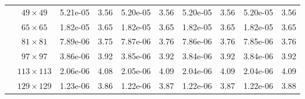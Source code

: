 \begin{table}[H]
{\begin{tabular*}{\textwidth}{@{\extracolsep\fill}c|c|cc|cc|cc|cc@{}}
                    & $49\times 49$ & 5.21e-05 & 3.56 & 5.20e-05 & 3.56 & 5.20e-05 & 3.56 & 5.20e-05 & 3.56 \\
                    & $65\times 65$ & 1.82e-05 & 3.65 & 1.82e-05 & 3.65 & 1.82e-05 & 3.65 & 1.82e-05 & 3.65 \\
                    & $81\times 81$ & 7.89e-06 & 3.75 & 7.87e-06 & 3.76 & 7.86e-06 & 3.76 & 7.85e-06 & 3.76 \\
                    & $97\times 97$ & 3.86e-06 & 3.92 & 3.85e-06 & 3.92 & 3.84e-06 & 3.92 & 3.84e-06 & 3.92 \\
                    & $113\times 113$ & 2.06e-06 & 4.08 & 2.05e-06 & 4.09 & 2.04e-06 & 4.09 & 2.04e-06 & 4.09 \\
                    & $129\times 129$ & 1.23e-06 & 3.86 & 1.22e-06 & 3.87 & 1.22e-06 & 3.87 & 1.22e-06 & 3.88 \\
                    \bottomrule
                \end{tabular*}
		}{
		\fdadospesquisa
	}
\end{table}

